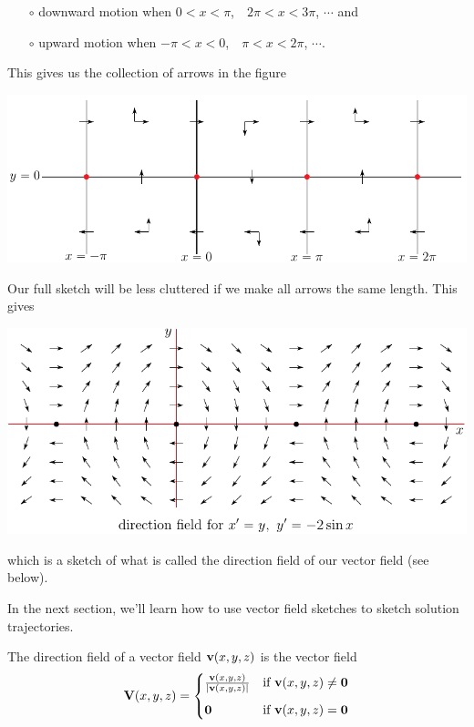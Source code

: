 \begin{eg}
\begin{itemize}
\item[$\circ$]
downward motion when $0<x<\pi$,\ \  $2\pi<x<3\pi$, $\cdots$ and 
\item[$\circ$]
upward motion when $-\pi<x<0$,\ \  $\pi<x<2\pi$, $\cdots$. 
\end{itemize}
This gives us the collection of arrows in the figure
\begin{wfig}
\begin{center}
    \includegraphics{phasePendulum1.pdf}
\end{center}
\end{wfig}
Our full sketch will be less cluttered if we make all arrows the
same length. This gives
\begin{wfig}
\begin{center}
    \null\hskip0.3in\includegraphics{pendulumField2.pdf}
\end{center}
\end{wfig}
which is a sketch of what is called the direction field of our vector field
(see below). 

In the next section, we'll learn how to use vector field sketches to sketch solution trajectories.
\end{eg}

\begin{defn}\label{def:VFdirnFld}
The direction field of a vector field $\mathbf{v}(x,y,z)$ is the vector field
\begin{equation*}
\mathbf{V}(x,y,z) =\begin{cases}
   \frac{\mathbf{v}(x,y,z)}{|\mathbf{v}(x,y,z)|} &\text{if $\mathbf{v}(x,y,z)\ne\mathbf{0}$} \\[0.1in]
     \mathbf{0} & \text{if $\mathbf{v}(x,y,z) = \mathbf{0}$}
\end{cases}
\end{equation*}
\end{defn}

